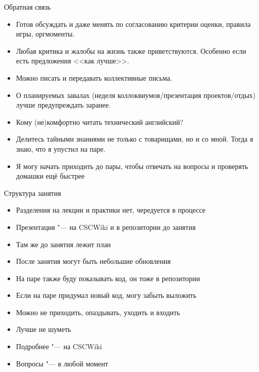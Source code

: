 \begin{frame}[t]{Обратная связь}
	\begin{itemize}
		\item
			Готов обсуждать и даже менять по согласованию критерии оценки, правила игры, оргмоменты.
		\item
			Любая критика и жалобы на жизнь также приветствуются.
			Особенно если есть предложения <<как лучше>>.
		\item
			Можно писать и передавать коллективные письма.
		\item
			О планируемых завалах (неделя коллоквиумов/презентация проектов/отдых) лучше предупреждать заранее.
		\item
			Кому (не)комфортно читать технический английский?
		\item
			Делитесь тайными знаниями не только с товарищами, но и со мной.
			Тогда я знаю, что я упустил на паре.
		\item Я могу начать приходить до пары, чтобы отвечать на вопросы и проверять домашки ещё быстрее
	\end{itemize}
\end{frame}

\begin{frame}[t]{Структура занятия}
	\begin{itemize}
		\item Разделения на лекции и практики нет, чередуется в процессе
		\item Презентация "--- на CSCWiki и в репозитории до занятия
		\item Там же до занятия лежит план
		\item После занятия могут быть небольшие обновления
		\item На паре также буду показывать код, он тоже в репозитории
		\item Если на паре придумал новый код, могу забыть выложить
		\item Можно не приходить, опаздывать, уходить и входить
		\item Лучше не шуметь
		\item Подробнее "--- на CSCWiki
		\item Вопросы "--- в любой момент
	\end{itemize}
\end{frame}
